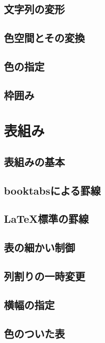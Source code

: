 \documentclass{jsbook}
\begin{document}
\section{文字列の変形}

\section{色空間とその変換}

\section{色の指定}

\section{枠囲み}

\chapter{表組み}

\section{表組みの基本}

\section{booktabsによる罫線}

\section{LaTeX標準の罫線}

\section{表の細かい制御}

\section{列割りの一時変更}

\section{横幅の指定}

\section{色のついた表}
\end{document}
